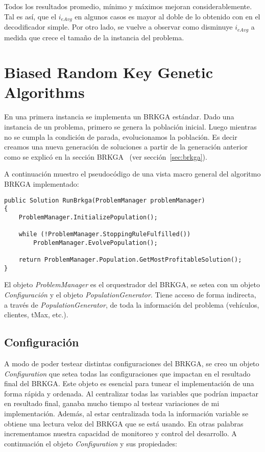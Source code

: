 Todos los resultados promedio, mínimo y máximos mejoran considerablemente. Tal es así, que el $i_{eAvg}$ en algunos casos es mayor al doble de lo obtenido con en el decodificador simple. Por otro lado, se vuelve a observar como disminuye $i_{eAvg}$ a medida que crece el tamaño de la instancia del problema.

\section{Biased Random Key Genetic Algorithms}

En una primera instancia se implementa un BRKGA estándar. Dado una instancia de un problema, primero se genera la población inicial. Luego mientras no se cumpla la condición de parada, evolucionamos la población. Es decir creamos una nueva generación de soluciones a partir de la generación anterior como se explicó en la sección BRKGA ~(ver sección~\ref{sec:brkga}).

\bigskip

A continuación muestro el pseudocódigo de una vista macro general del algoritmo BRKGA implementado:

\bigskip

\begin{minipage}{\textwidth}
\begin{lstlisting} 
public Solution RunBrkga(ProblemManager problemManager)
{
    ProblemManager.InitializePopulation();

    while (!ProblemManager.StoppingRuleFulfilled())
        ProblemManager.EvolvePopulation();

    return ProblemManager.Population.GetMostProfitableSolution();
}
\end{lstlisting}
\end{minipage}

\bigskip

El objeto \textit{ProblemManager} es el orquestrador del BRKGA, se setea con un objeto \textit{Configuración} y el objeto \textit{PopulationGenerator}. Tiene acceso de forma indirecta, a través de \textit{PopulationGenerator}, de toda la información del problema (vehículos, clientes, tMax, etc.).

\subsection{Configuración} \label{sec:config}

A modo de poder testear distintas configuraciones del BRKGA, se creo un objeto \textit{Configuration} que setea todas las configuraciones que impactan en el resultado final del BRKGA. Este objeto es esencial para tunear el implementación de una forma rápida y ordenada. Al centralizar todas las variables que podrían impactar en resultado final, ganaba mucho tiempo al testear variaciones de mi implementación. Además, al estar centralizada toda la información variable se obtiene una lectura veloz del BRKGA que se está usando. En otras palabras incrementamos nuestra capacidad de monitoreo y control del desarrollo. A continuación el objeto \textit{Configuration} y sus propiedades:

